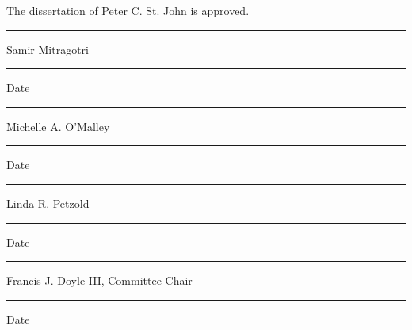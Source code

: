 \thispagestyle{empty}
The dissertation of Peter C. St. John is approved.
\vfil
\begin{minipage}{0.6\textwidth}
  \rule{\textwidth}{0.7pt}
  {\sc Samir Mitragotri}
\end{minipage}
\hfill
\begin{minipage}{0.3\textwidth}
  \rule{\textwidth}{0.7pt}
  {\sc Date}
\end{minipage}

\vfil
\begin{minipage}{0.6\textwidth}
  \rule{\textwidth}{0.7pt}
  {\sc Michelle A. O'Malley}
\end{minipage}
\hfill
\begin{minipage}{0.3\textwidth}
  \rule{\textwidth}{0.7pt}
  {\sc Date}
\end{minipage}

\vfil
\begin{minipage}{0.6\textwidth}
  \rule{\textwidth}{0.7pt}
  {\sc Linda R. Petzold}
\end{minipage}
\hfill
\begin{minipage}{0.3\textwidth}
  \rule{\textwidth}{0.7pt}
  {\sc Date}
\end{minipage}

\vfil
\begin{minipage}{0.6\textwidth}
  \rule{\textwidth}{0.7pt}
  {\sc Francis J. Doyle III, Committee Chair}
\end{minipage}
\hfill
\begin{minipage}{0.3\textwidth}
  \rule{\textwidth}{0.7pt}
  {\sc Date}
\end{minipage}

